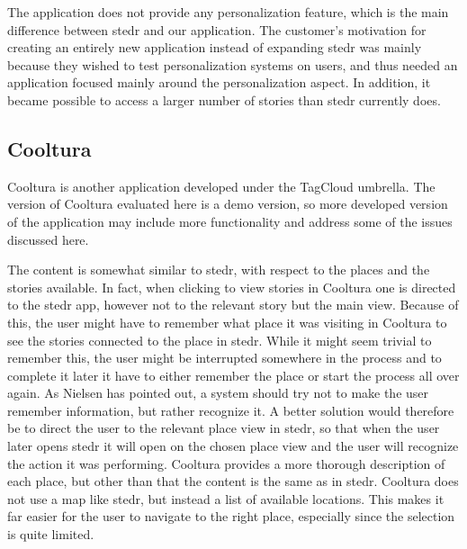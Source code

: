 The application does not provide any personalization feature, which is the main difference between stedr and our application. The customer’s motivation for creating an entirely new application instead of expanding stedr was mainly because they wished to test personalization systems on users, and thus needed an application focused mainly around the personalization aspect. In addition, it became possible to access a larger number of stories than stedr currently does. 

\subsection{Cooltura}

Cooltura is another application developed under the TagCloud umbrella. The version of Cooltura evaluated here is a demo version, so more developed version of the application may include more functionality and address some of the issues discussed here. \newline

The content is somewhat similar to stedr, with respect to the places and the stories available. In fact, when clicking to view stories in Cooltura one is directed to the stedr app, however not to the relevant story but the main view. Because of this, the user might have to remember what place it was visiting in Cooltura to see the stories connected to the place in stedr. While it might seem trivial to remember this, the user might be interrupted somewhere in the process and to complete it later it have to either remember the place or start the process all over again. As Nielsen has pointed out, a system should try not to make the user remember information, but rather recognize it. A better solution would therefore be to direct the user to the relevant place view in stedr, so that when the user later opens stedr it will open on the chosen place view and the user will recognize the action it was performing. Cooltura provides a more thorough description of each place, but other than that the content is the same as in stedr. Cooltura does not use a map like stedr, but instead a list of available locations. This makes it far easier for the user to navigate to the right place, especially since the selection is quite limited. \newline

